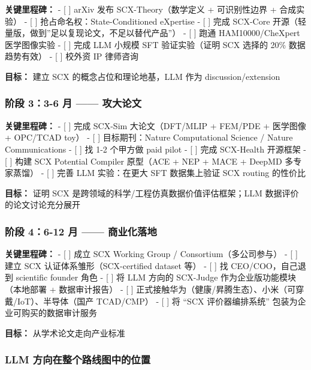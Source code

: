 \documentclass[
  12pt,
]{ctexart}
\begin{document}
\textbf{关键里程碑：} - {[} {]} arXiv 发布 SCX-Theory（数学定义 +
可识别性边界 + 合成实验） - {[} {]} 抢占命名权：State-Conditioned
eXpertise - {[} {]} 完成 SCX-Core
开源（轻量版，做到''足以复现论文，不足以替代产品''） - {[} {]} 跑通
HAM10000/CheXpert 医学图像实验 - {[} {]} 完成 LLM 小规模 SFT
验证实验（证明 SCX 选择的 20\% 数据趋势有效） - {[} {]} 校外资 IP
律师咨询

\textbf{目标：} 建立 SCX 的概念占位和理论地基，LLM 作为
discussion/extension

\subsubsection{阶段 3：3-6 月 ------
攻大论文}\label{ux9636ux6bb5-33-6-ux6708-ux653bux5927ux8bbaux6587}

\textbf{关键里程碑：} - {[} {]} 完成 SCX-Sim 大论文（DFT/MLIP + FEM/PDE
+ 医学图像 + OPC/TCAD toy） - {[} {]} 目标期刊：Nature Computational
Science / Nature Communications - {[} {]} 找 1-2 个甲方做 paid pilot -
{[} {]} 完成 SCX-Health 开源框架 - {[} {]} 构建 SCX Potential Compiler
原型（ACE + NEP + MACE + DeepMD 多专家蒸馏） - {[} {]} 完善 LLM
实验：在更大 SFT 数据集上验证 SCX routing 的性价比

\textbf{目标：} 证明 SCX 是跨领域的科学/工程仿真数据价值评估框架；LLM
数据评价的论文讨论充分展开

\subsubsection{阶段 4：6-12 月 ------
商业化落地}\label{ux9636ux6bb5-46-12-ux6708-ux5546ux4e1aux5316ux843dux5730}

\textbf{关键里程碑：} - {[} {]} 成立 SCX Working Group /
Consortium（多公司参与） - {[} {]} 建立 SCX 认证体系雏形（SCX-certified
dataset 等） - {[} {]} 找 CEO/COO，自己退到 scientific founder 角色 -
{[} {]} 将 LLM 方向的 SCX-Judge 作为企业版功能模块（本地部署 +
数据审计报告） - {[} {]}
正式接触华为（健康/昇腾生态）、小米（可穿戴/IoT）、半导体（国产
TCAD/CMP） - {[} {]} 将 ``SCX 评价器编排系统''
包装为企业可购买的数据审计服务

\textbf{目标：} 从学术论文走向产业标准

\subsubsection{LLM
方向在整个路线图中的位置}\label{llm-ux65b9ux5411ux5728ux6574ux4e2aux8defux7ebfux56feux4e2dux7684ux4f4dux7f6e}
\end{document}
